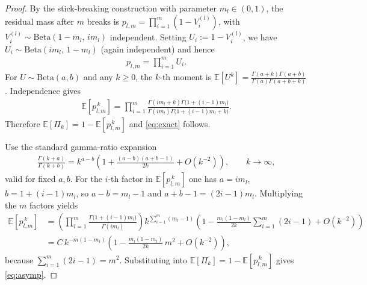 \documentclass{article}
\theoremstyle{remark} %
\begin{document}
\begin{proof}
By the stick-breaking construction with parameter $m_l\in(0,1)$, the residual mass after $m$ breaks is
$p_{l,m}=\prod_{i=1}^{m}(1-V^{(l)}_i)$, with $V^{(l)}_i\sim\mathrm{Beta}(1-m_l,\,im_l)$ independent.
Setting $U_i:=1-V^{(l)}_i$, we have $U_i\sim\mathrm{Beta}(im_l,\,1-m_l)$ (again independent) and hence
\begin{align}
p_{l,m} = \prod_{i=1}^m U_i.
\end{align}
For $U\sim\mathrm{Beta}(a,b)$ and any $k\ge0$, the $k$-th moment is
$\mathbb{E}[U^k]=\frac{\Gamma(a+k)\Gamma(a+b)}{\Gamma(a)\Gamma(a+b+k)}$.
Independence gives
\begin{align}
\mathbb{E} \left[p_{l,m}^{\,k}\right]
=\prod_{i=1}^{m}
\frac{\Gamma(im_l+k)\Gamma \big(1+(i-1)m_l\big)}
{\Gamma(im_l)\Gamma \big(1+(i-1)m_l+k\big)}.
\end{align}
Therefore $\mathbb{E}[\Pi_k]=1-\mathbb{E}[p_{l,m}^{\,k}]$ and \eqref{eq:exact} follows.

Use the standard gamma-ratio expansion
\begin{align}
\frac{\Gamma(k+a)}{\Gamma(k+b)}
= k^{a-b} \left(1+\frac{(a-b)(a+b-1)}{2k}+O(k^{-2})\right), \qquad k\to\infty,
\end{align}
valid for fixed $a,b$.
For the $i$-th factor in $\mathbb{E}[p_{l,m}^{\,k}]$ one has $a=im_l$, $b=1+(i-1)m_l$, so $a-b=m_l-1$
and $a+b-1=(2i-1)m_l$. Multiplying the $m$ factors yields
\begin{align}
\mathbb{E} \left[p_{l,m}^{\,k}\right]
&= \left(\prod_{i=1}^{m}\frac{\Gamma \big(1+(i-1)m_l\big)}{\Gamma(im_l)}\right)
k^{\sum_{i=1}^{m}(m_l-1)}
\left(1-\frac{m_l(1-m_l)}{2k}\sum_{i=1}^{m}(2i-1)+O(k^{-2})\right) \\
&= C\,k^{-m(1-m_l)}
\left(1-\frac{m_l(1-m_l)}{2k}\,m^2+O(k^{-2})\right),
\end{align}
because $\sum_{i=1}^m(2i-1)=m^2$. Substituting into $\mathbb{E}[\Pi_k]=1-\mathbb{E}[p_{l,m}^{\,k}]$
gives \eqref{eq:asymp}.
\end{proof}
\end{document}
